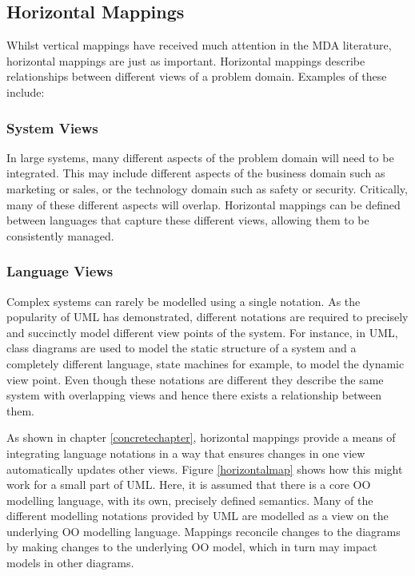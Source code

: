 \subsection{Horizontal Mappings}

Whilst vertical mappings have received much attention in the MDA
literature, horizontal mappings are just as important. Horizontal
mappings describe relationships between different views of a
problem domain. Examples of these include:

\subsubsection{System Views}

In large systems, many different aspects of the problem domain
will need to be integrated. This may include different aspects of
the business domain such as marketing or sales, or the technology
domain such as safety or security. Critically, many of these
different aspects will overlap. Horizontal mappings can be defined
between languages that capture these different views, allowing
them to be consistently managed.

\subsubsection{Language Views}

Complex systems can rarely be modelled using a single notation. As
the popularity of UML has demonstrated, different notations are
required to precisely and succinctly model different view points
of the system. For instance, in UML, class diagrams are used to
model the static structure of a system and a completely different
language, state machines for example, to model the dynamic view
point. Even though these notations are different they describe the
same system with overlapping views and hence there exists a
relationship between them.

As shown in chapter \ref{concretechapter}, horizontal mappings
provide a means of integrating language notations in a way that
ensures changes in one view automatically updates other views.
Figure \ref{horizontalmap} shows how this might work for a small
part of UML. Here, it is assumed that there is a core OO modelling
language, with its own, precisely defined semantics. Many of the
different modelling notations provided by UML are modelled as a
view on the underlying OO modelling language. Mappings reconcile
changes to the diagrams by making changes to the underlying OO
model, which in turn may impact models in other diagrams.

